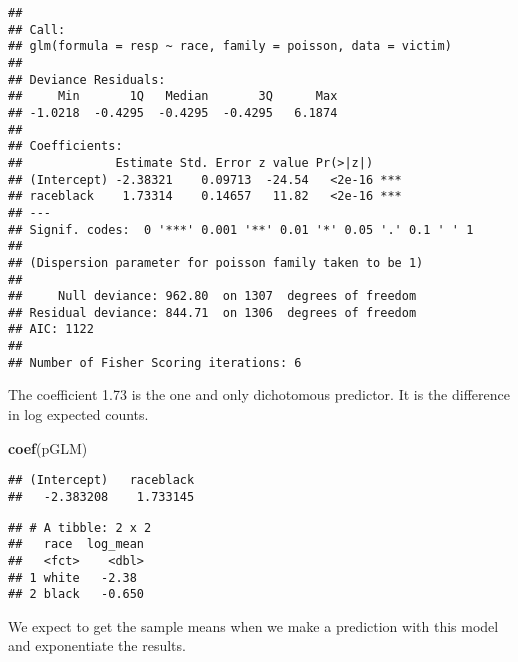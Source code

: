 \documentclass[]{article}
\newenvironment{Shaded}{\begin{snugshade}}{\end{snugshade}}
\newcommand{\KeywordTok}[1]{\textcolor[rgb]{0.13,0.29,0.53}{\textbf{{#1}}}}
\newcommand{\DataTypeTok}[1]{\textcolor[rgb]{0.13,0.29,0.53}{{#1}}}
\newcommand{\StringTok}[1]{\textcolor[rgb]{0.31,0.60,0.02}{{#1}}}
\newcommand{\NormalTok}[1]{{#1}}
\begin{document}
\begin{verbatim}
## 
## Call:
## glm(formula = resp ~ race, family = poisson, data = victim)
## 
## Deviance Residuals: 
##     Min       1Q   Median       3Q      Max  
## -1.0218  -0.4295  -0.4295  -0.4295   6.1874  
## 
## Coefficients:
##             Estimate Std. Error z value Pr(>|z|)    
## (Intercept) -2.38321    0.09713  -24.54   <2e-16 ***
## raceblack    1.73314    0.14657   11.82   <2e-16 ***
## ---
## Signif. codes:  0 '***' 0.001 '**' 0.01 '*' 0.05 '.' 0.1 ' ' 1
## 
## (Dispersion parameter for poisson family taken to be 1)
## 
##     Null deviance: 962.80  on 1307  degrees of freedom
## Residual deviance: 844.71  on 1306  degrees of freedom
## AIC: 1122
## 
## Number of Fisher Scoring iterations: 6
\end{verbatim}

The coefficient 1.73 is the one and only dichotomous predictor. It is
the difference in log expected counts.

\begin{Shaded}
\begin{Highlighting}[]
\KeywordTok{coef}\NormalTok{(pGLM)}
\end{Highlighting}
\end{Shaded}

\begin{verbatim}
## (Intercept)   raceblack 
##   -2.383208    1.733145
\end{verbatim}

\begin{Shaded}
\end{Shaded}

\begin{verbatim}
## # A tibble: 2 x 2
##   race  log_mean
##   <fct>    <dbl>
## 1 white   -2.38 
## 2 black   -0.650
\end{verbatim}

We expect to get the sample means when we make a prediction with this
model and exponentiate the results.

\begin{Shaded}
\end{Shaded}
\end{document}
